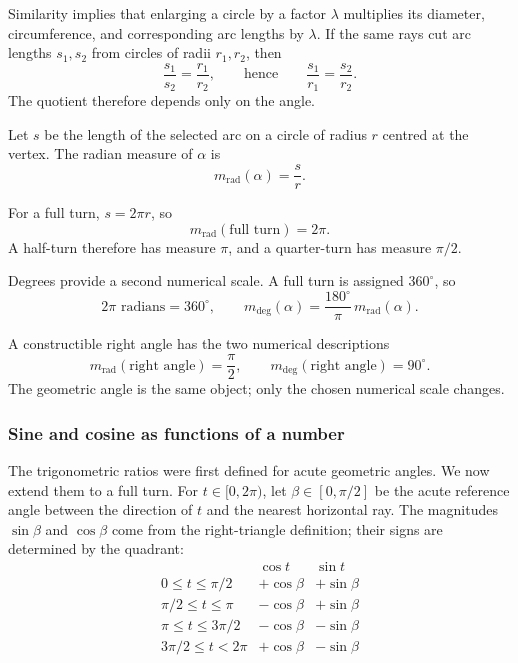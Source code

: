 \begin{proofbox}
Similarity implies that enlarging a circle by a factor $\lambda$ multiplies its
diameter, circumference, and corresponding arc lengths by $\lambda$. If the
same rays cut arc lengths $s_1,s_2$ from circles of radii $r_1,r_2$, then
\[
\frac{s_1}{s_2}=\frac{r_1}{r_2},
\qquad\text{hence}\qquad
\frac{s_1}{r_1}=\frac{s_2}{r_2}.
\]
The quotient therefore depends only on the angle.
\end{proofbox}

\begin{definitionbox}
Let $s$ be the length of the selected arc on a circle of radius $r$ centred at
the vertex. The radian measure of $\alpha$ is
\[
\boxed{m_{\mathrm{rad}}(\alpha)=\frac{s}{r}}.
\]
\end{definitionbox}

\begin{derivationbox}
For a full turn, $s=2\pi r$, so
\[
m_{\mathrm{rad}}(\text{full turn})=2\pi.
\]
A half-turn therefore has measure $\pi$, and a quarter-turn has measure $\pi/2$.
\end{derivationbox}

\begin{definitionbox}
Degrees provide a second numerical scale. A full turn is assigned $360^\circ$,
so
\[
2\pi\text{ radians}=360^\circ,
\qquad
\boxed{
m_{\deg}(\alpha)=\frac{180^\circ}{\pi}\,m_{\mathrm{rad}}(\alpha)
}.
\]
\end{definitionbox}

\begin{examplebox}
A constructible right angle has the two numerical descriptions
\[
m_{\mathrm{rad}}(\text{right angle})=\frac{\pi}{2},
\qquad
m_{\deg}(\text{right angle})=90^\circ.
\]
The geometric angle is the same object; only the chosen numerical scale changes.
\end{examplebox}

\subsubsection*{Sine and cosine as functions of a number}

The trigonometric ratios were first defined for acute geometric angles. We now
extend them to a full turn. For $t\in[0,2\pi)$, let $\beta\in[0,\pi/2]$ be the
acute reference angle between the direction of $t$ and the nearest horizontal
ray. The magnitudes $\sin\beta$ and $\cos\beta$ come from the right-triangle
definition; their signs are determined by the quadrant:
\[
\begin{array}{c|cc}
&\cos t&\sin t\\ \hline
0\le t\le \pi/2&+\cos\beta&+\sin\beta\\
\pi/2\le t\le \pi&-\cos\beta&+\sin\beta\\
\pi\le t\le 3\pi/2&-\cos\beta&-\sin\beta\\
3\pi/2\le t<2\pi&+\cos\beta&-\sin\beta
\end{array}
\]

